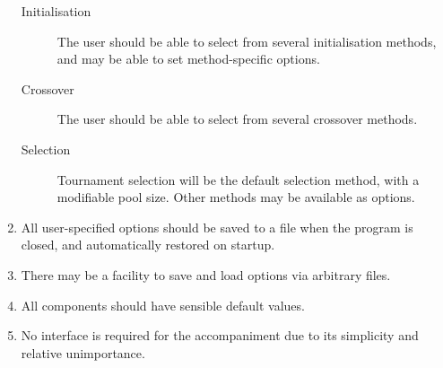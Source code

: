 \begin{enumerate}[resume]
\begin{description}
		\item[Initialisation] The user should be able to select from several initialisation methods, and may be able to set method-specific options.
		\item[Crossover] The user should be able to select from several crossover methods.
		\item[Selection] Tournament selection will be the default selection method, with a modifiable pool size. Other methods may be available as options.
	\end{description}
	\item All user-specified options should be saved to a file when the program is closed, and automatically restored on startup.
	\item There may be a facility to save and load options via arbitrary files.
	\item All components should have sensible default values.
	\item No interface is required for the accompaniment due to its simplicity and relative unimportance.
\end{enumerate}
